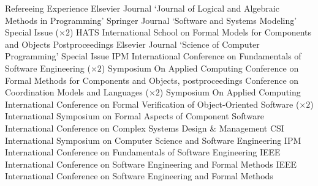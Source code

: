 
\begin{rubric}{Refereeing Experience}
		Elsevier Journal `Journal of Logical and Algebraic Methods in Programming'
		Springer Journal `Software and Systems Modeling' Special Issue ($\times 2$)
		HATS International School on Formal Models for Components and Objects Postproceedings
		Elsevier Journal `Science of Computer Programming' Special Issue
		 IPM International Conference on Fundamentals of Software Engineering ($\times 2$)
		 Symposium On Applied Computing
		 Conference on Formal Methods for Components and Objects, postproceedings
		 Conference on Coordination Models and Languages ($\times 2$)
		 Symposium On Applied Computing
		 International Conference on Formal Verification of Object-Oriented Software ($\times 2$)
		 International Symposium on Formal Aspects of Component Software
		 International Conference on Complex Systems Design \& Management
		 CSI International Symposium on Computer Science and Software Engineering
		 IPM International Conference on Fundamentals of Software Engineering
		 IEEE International Conference on Software Engineering and Formal Methods
		 IEEE International Conference on Software Engineering and Formal Methods
\end{rubric}

